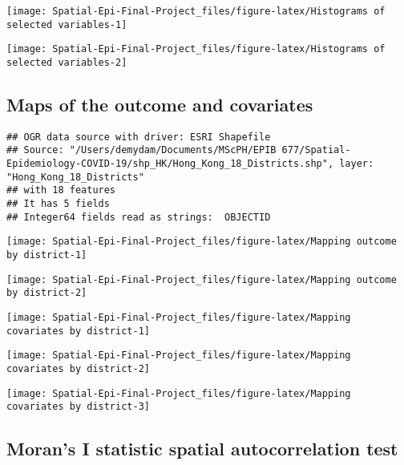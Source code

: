 \documentclass[]{article}
\begin{document}
\begin{center}\texttt{[image: Spatial-Epi-Final-Project\_files/figure-latex/Histograms of selected variables-1]} \end{center}

\begin{center}\texttt{[image: Spatial-Epi-Final-Project\_files/figure-latex/Histograms of selected variables-2]} \end{center}

\hypertarget{maps-of-the-outcome-and-covariates}{%
\subsection{Maps of the outcome and
covariates}\label{maps-of-the-outcome-and-covariates}}

\begin{verbatim}
## OGR data source with driver: ESRI Shapefile 
## Source: "/Users/demydam/Documents/MScPH/EPIB 677/Spatial-Epidemiology-COVID-19/shp_HK/Hong_Kong_18_Districts.shp", layer: "Hong_Kong_18_Districts"
## with 18 features
## It has 5 fields
## Integer64 fields read as strings:  OBJECTID
\end{verbatim}

\begin{center}\texttt{[image: Spatial-Epi-Final-Project\_files/figure-latex/Mapping outcome by district-1]} \end{center}

\begin{center}\texttt{[image: Spatial-Epi-Final-Project\_files/figure-latex/Mapping outcome by district-2]} \end{center}

\begin{center}\texttt{[image: Spatial-Epi-Final-Project\_files/figure-latex/Mapping covariates by district-1]} \end{center}

\begin{center}\texttt{[image: Spatial-Epi-Final-Project\_files/figure-latex/Mapping covariates by district-2]} \end{center}

\begin{center}\texttt{[image: Spatial-Epi-Final-Project\_files/figure-latex/Mapping covariates by district-3]} \end{center}

\hypertarget{morans-i-statistic-spatial-autocorrelation-test}{%
\subsection{Moran's I statistic spatial autocorrelation
test}\label{morans-i-statistic-spatial-autocorrelation-test}}
\end{document}
